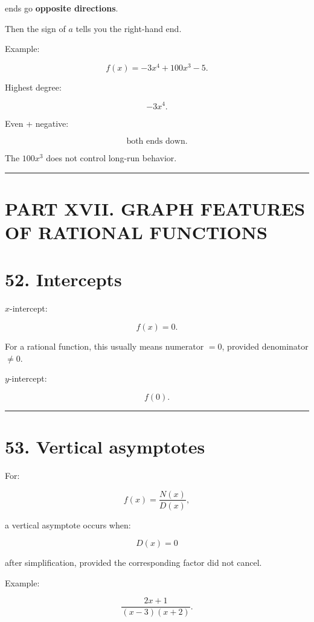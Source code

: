 \documentclass[
]{article}
\begin{document}
ends go \textbf{opposite directions}.

Then the sign of \(a\) tells you the right-hand end.

Example:

\[
f(x)=-3x^4+100x^3-5.
\]

Highest degree:

\[
-3x^4.
\]

Even + negative:

\[
\boxed{\text{both ends down}}.
\]

The \(100x^3\) does not control long-run behavior.

\begin{center}\rule{0.5\linewidth}{0.5pt}\end{center}

\section{PART XVII. GRAPH FEATURES OF RATIONAL
FUNCTIONS}\label{part-xvii.-graph-features-of-rational-functions}

\section{52. Intercepts}\label{intercepts}

\(x\)-intercept:

\[
f(x)=0.
\]

For a rational function, this usually means numerator \(=0\), provided
denominator \(\neq0\).

\(y\)-intercept:

\[
f(0).
\]

\begin{center}\rule{0.5\linewidth}{0.5pt}\end{center}

\section{53. Vertical asymptotes}\label{vertical-asymptotes}

For:

\[
f(x)=\frac{N(x)}{D(x)},
\]

a vertical asymptote occurs when:

\[
D(x)=0
\]

after simplification, provided the corresponding factor did not cancel.

Example:

\[
\frac{2x+1}{(x-3)(x+2)}.
\]
\end{document}
